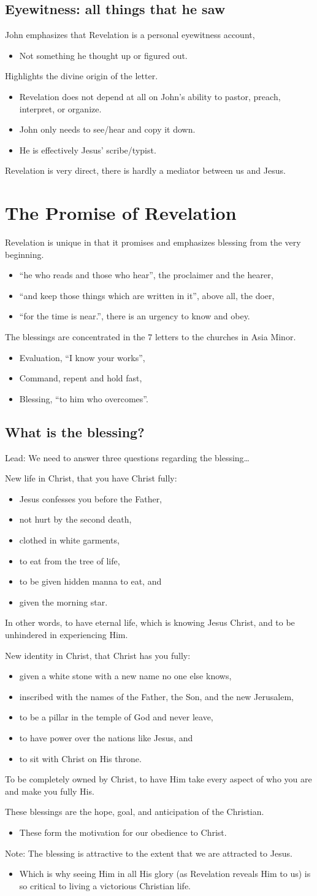 \documentclass[12pt]{article}
\newcommand{\BI}{\begin{itemize}}
\newcommand{\EI}{\end{itemize}}
\newcommand{\I}{\item}
\begin{document}
\subsection{Eyewitness: all things that he saw}
\I  John emphasizes that Revelation is a personal eyewitness account,
\BI \I  Not something he thought up or figured out. \EI
\I  Highlights the divine origin of the letter.
\BI \I  Revelation does not depend at all on John's ability to pastor, preach, interpret, or organize.
    \I  John only needs to see/hear and copy it down.
    \I  He is effectively Jesus' scribe/typist.
\EI
\I  Revelation is very direct, there is hardly a mediator between us and Jesus.

\section{The Promise of Revelation}
\I  Revelation is unique in that it promises and emphasizes blessing from the very beginning.
\BI \I  ``he who reads and those who hear'', the proclaimer and the hearer,
    \I  ``and keep those things which are written in it'', above all, the doer,
    \I  ``for the time is near.'', there is an urgency to know and obey. \EI
\I  The blessings are concentrated in the 7 letters to the churches in Asia Minor.
\BI \I  Evaluation, ``I know your works'',
    \I  Command, repent and hold fast,
    \I  Blessing, ``to him who overcomes''. \EI

\subsection{What is the blessing?}
\I  Lead: We need to answer three questions regarding the blessing\ldots
\I  New life in Christ, that you have Christ fully: 
\BI \I  Jesus confesses you before the Father,
    \I  not hurt by the second death,
    \I  clothed in white garments, 
    \I  to eat from the tree of life,
    \I  to be given hidden manna to eat, and
    \I  given the morning star. \EI
    In other words, to have eternal life, which is knowing Jesus Christ, and to be unhindered in experiencing Him.
\I  New identity in Christ, that Christ has you fully:
\BI \I  given a white stone with a new name no one else knows,
    \I  inscribed with the names of the Father, the Son, and the new Jerusalem,
    \I  to be a pillar in the temple of God and never leave,
    \I  to have power over the nations like Jesus, and
    \I  to sit with Christ on His throne. \EI
    To be completely owned by Christ, to have Him take every aspect of who you are and make you fully His.
\I  These blessings are the hope, goal, and anticipation of the Christian.
\BI \I  These form the motivation for our obedience to Christ. \EI
\I  Note: The blessing is attractive to the extent that we are attracted to Jesus.
\BI \I  Which is why seeing Him in all His glory (as Revelation reveals Him to us)
        is so critical to living a victorious Christian life. \EI
\end{document}
